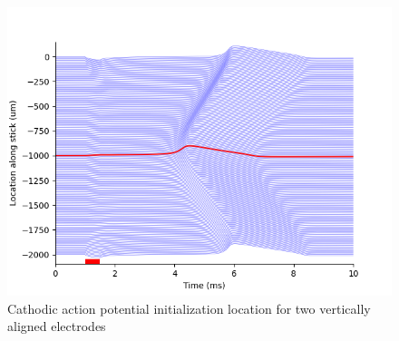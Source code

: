 \documentclass{article}
\begin{document}
\begin{figure}[htbp]
\begin{minipage}[b]{0.3\textwidth}
        \end{minipage}
        \hfill
        \begin{minipage}[b]{0.3\textwidth}
            \includegraphics[width=\textwidth]{FE_vertical_cathodic_loc}
            \caption{Cathodic action potential initialization location for two vertically aligned electrodes}
            \label{fig:FE_vertical_cathodic_loc}
        \end{minipage}
    \end{figure}
\end{document}
